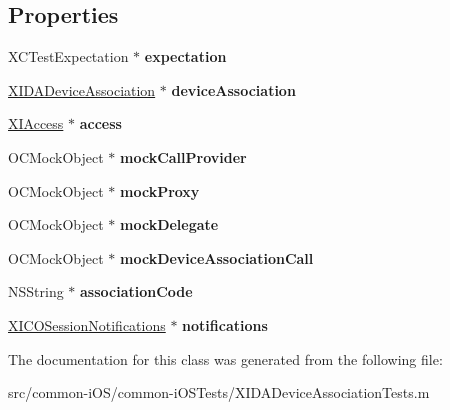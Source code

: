 \subsection*{Properties}
\begin{DoxyCompactItemize}
\item 
\hypertarget{interface_x_i_d_a_device_association_tests_acf030a0e11a4cb359f7440a423168aac}{}\label{interface_x_i_d_a_device_association_tests_acf030a0e11a4cb359f7440a423168aac} 
X\+C\+Test\+Expectation $\ast$ {\bfseries expectation}
\item 
\hypertarget{interface_x_i_d_a_device_association_tests_a16ea24e3bdeb04fc007fbfe63135dd40}{}\label{interface_x_i_d_a_device_association_tests_a16ea24e3bdeb04fc007fbfe63135dd40} 
\hyperlink{interface_x_i_d_a_device_association}{X\+I\+D\+A\+Device\+Association} $\ast$ {\bfseries device\+Association}
\item 
\hypertarget{interface_x_i_d_a_device_association_tests_ae3153477d58d7bb326c37931d307ec06}{}\label{interface_x_i_d_a_device_association_tests_ae3153477d58d7bb326c37931d307ec06} 
\hyperlink{class_x_i_access}{X\+I\+Access} $\ast$ {\bfseries access}
\item 
\hypertarget{interface_x_i_d_a_device_association_tests_ae38f29fb35b232dbde294bc9c555fbaf}{}\label{interface_x_i_d_a_device_association_tests_ae38f29fb35b232dbde294bc9c555fbaf} 
O\+C\+Mock\+Object $\ast$ {\bfseries mock\+Call\+Provider}
\item 
\hypertarget{interface_x_i_d_a_device_association_tests_ae8f20cd8a6bb60e65d90ecd8956ea4f5}{}\label{interface_x_i_d_a_device_association_tests_ae8f20cd8a6bb60e65d90ecd8956ea4f5} 
O\+C\+Mock\+Object $\ast$ {\bfseries mock\+Proxy}
\item 
\hypertarget{interface_x_i_d_a_device_association_tests_a85b3aed0a7bf33434f3cbfe49b5b7ff6}{}\label{interface_x_i_d_a_device_association_tests_a85b3aed0a7bf33434f3cbfe49b5b7ff6} 
O\+C\+Mock\+Object $\ast$ {\bfseries mock\+Delegate}
\item 
\hypertarget{interface_x_i_d_a_device_association_tests_ac200b437ac93ea4c7c3e941d0d66d71a}{}\label{interface_x_i_d_a_device_association_tests_ac200b437ac93ea4c7c3e941d0d66d71a} 
O\+C\+Mock\+Object $\ast$ {\bfseries mock\+Device\+Association\+Call}
\item 
\hypertarget{interface_x_i_d_a_device_association_tests_ad47478b067cb553bf199aab9a290ae79}{}\label{interface_x_i_d_a_device_association_tests_ad47478b067cb553bf199aab9a290ae79} 
N\+S\+String $\ast$ {\bfseries association\+Code}
\item 
\hypertarget{interface_x_i_d_a_device_association_tests_a01e084c88eee8729624aa26c8a3807fb}{}\label{interface_x_i_d_a_device_association_tests_a01e084c88eee8729624aa26c8a3807fb} 
\hyperlink{interface_x_i_c_o_session_notifications}{X\+I\+C\+O\+Session\+Notifications} $\ast$ {\bfseries notifications}
\end{DoxyCompactItemize}


The documentation for this class was generated from the following file\+:\begin{DoxyCompactItemize}
\item 
src/common-\/i\+O\+S/common-\/i\+O\+S\+Tests/X\+I\+D\+A\+Device\+Association\+Tests.\+m\end{DoxyCompactItemize}
